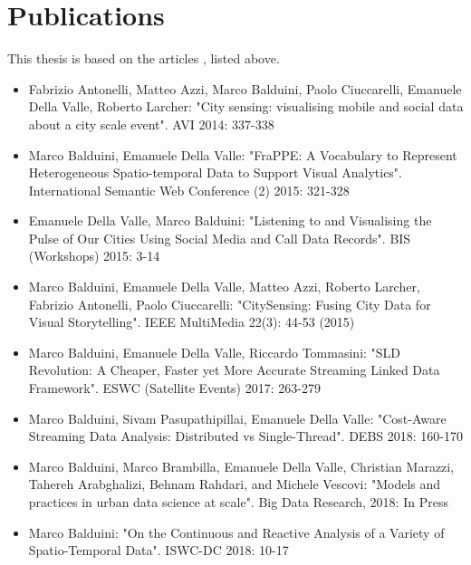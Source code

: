 \section{Publications}

This thesis is based on the articles \cite{DBLP:conf/avi/AntonelliABCVL14,DBLP:conf/semweb/BalduiniV15,DBLP:conf/bis/ValleB15,DBLP:conf/esws/BalduiniV017a,DBLP:journals/ieeemm/BalduiniVALAC15,DBLP:conf/debs/BalduiniPV18,BalduiniJBD2018,BalduiniISWC2018DC}, listed above.

\begin{itemize}
\item Fabrizio Antonelli, Matteo Azzi, Marco Balduini, Paolo Ciuccarelli, Emanuele Della Valle, Roberto Larcher:
"City sensing: visualising mobile and social data about a city scale event". AVI 2014: 337-338

\item Marco Balduini, Emanuele Della Valle:
"FraPPE: A Vocabulary to Represent Heterogeneous Spatio-temporal Data to Support Visual Analytics". International Semantic Web Conference (2) 2015: 321-328

\item 	Emanuele Della Valle, Marco Balduini:
"Listening to and Visualising the Pulse of Our Cities Using Social Media and Call Data Records". BIS (Workshops) 2015: 3-14

\item Marco Balduini, Emanuele Della Valle, Matteo Azzi, Roberto Larcher, Fabrizio Antonelli, Paolo Ciuccarelli:
"CitySensing: Fusing City Data for Visual Storytelling". IEEE MultiMedia 22(3): 44-53 (2015)

\item 	Marco Balduini, Emanuele Della Valle, Riccardo Tommasini:
"SLD Revolution: A Cheaper, Faster yet More Accurate Streaming Linked Data Framework". ESWC (Satellite Events) 2017: 263-279

\item Marco Balduini, Sivam Pasupathipillai, Emanuele Della Valle:
"Cost-Aware Streaming Data Analysis: Distributed vs Single-Thread". DEBS 2018: 160-170

\item Marco Balduini, Marco Brambilla, Emanuele Della Valle, Christian Marazzi, Tahereh Arabghalizi, Behnam Rahdari, and Michele Vescovi:
"Models and practices in urban data science at scale". Big Data Research, 2018: In Press

\item Marco Balduini:
"On the Continuous and Reactive Analysis of a Variety of Spatio-Temporal Data". ISWC-DC 2018: 10-17

\end{itemize}